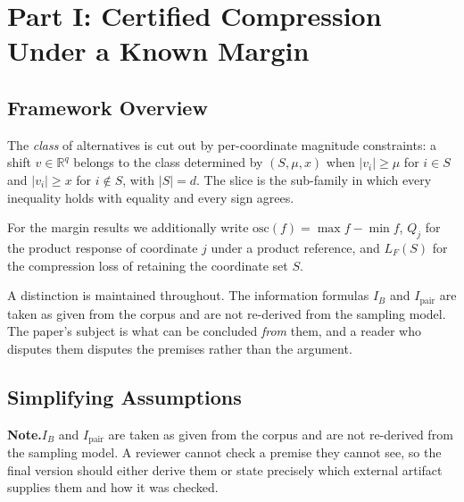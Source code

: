 \documentclass[conference]{IEEEtran}
\theoremstyle{definition}
\newif\ifshownotes\shownotestrue
\newcommand{\NOTEPAR}[1]{\ifshownotes\par\vspace{2pt}\noindent%
  {\color{notecol}\textsf{\footnotesize\textbf{Note.}\;#1}}\par\vspace{2pt}\fi}
\begin{document}
\section{Part I: Certified Compression Under a Known Margin}

\label{sec:d6-setting}

\subsection{Framework Overview}

The \emph{class} of alternatives is cut out by per-coordinate magnitude constraints: a shift
$v\in\mathbb{R}^{q}$ belongs to the class determined by $(S,\mu,x)$ when $|v_{i}|\ge\mu$ for
$i\in S$ and $|v_{i}|\ge x$ for $i\notin S$, with $|S|=d$. The slice is the sub-family in
which every inequality holds with equality and every sign agrees.

For the margin results we additionally write $\mathrm{osc}(f)=\max f-\min f$, $Q_{j}$ for the
product response of coordinate $j$ under a product reference, and $L_{F}(S)$ for the
compression loss of retaining the coordinate set $S$.

A distinction is maintained throughout. The information formulas $I_{B}$ and
$I_{\mathrm{pair}}$ are taken as given from the corpus and are not re-derived from the
sampling model. The paper's subject is what can be concluded \emph{from} them, and a reader
who disputes them disputes the premises rather than the argument.

\subsection{Simplifying Assumptions}
\NOTEPAR{$I_{B}$ and $I_{\mathrm{pair}}$ are taken as given from the corpus and are not
re-derived from the sampling model. A reviewer cannot check a premise they cannot see, so the
final version should either derive them or state precisely which external artifact supplies
them and how it was checked.}
\end{document}
